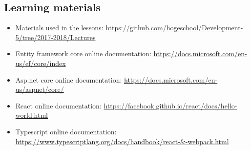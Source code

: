     \subsection{Learning materials}\label{learning-materials}

\begin{itemize}
\tightlist
\item
  Materials used in the lessons:
  \url{https://github.com/hogeschool/Development-5/tree/2017-2018/Lectures}
\item
  Entity framework core online documentation:
  \url{https://docs.microsoft.com/en-us/ef/core/index}
\item
  Asp.net core online documentation:
  \url{https://docs.microsoft.com/en-us/aspnet/core/}
\item
  React online documentation:
  \url{https://facebook.github.io/react/docs/hello-world.html}
\item
  Typescript online documentation:
 \url{https://www.typescriptlang.org/docs/handbook/react-\&-webpack.html}
\end{itemize}


% 
